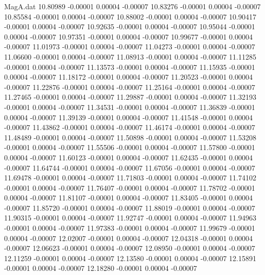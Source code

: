 \begin{filecontents}{MagA.dat}
  10.80989   -0.00001    0.00004   -0.00007
  10.83276   -0.00001    0.00004   -0.00007
  10.85584   -0.00001    0.00004   -0.00007
  10.88002   -0.00001    0.00004   -0.00007
  10.90417   -0.00001    0.00004   -0.00007
  10.92635   -0.00001    0.00004   -0.00007
  10.95044   -0.00001    0.00004   -0.00007
  10.97351   -0.00001    0.00004   -0.00007
  10.99677   -0.00001    0.00004   -0.00007
  11.01973   -0.00001    0.00004   -0.00007
  11.04273   -0.00001    0.00004   -0.00007
  11.06600   -0.00001    0.00004   -0.00007
  11.08913   -0.00001    0.00004   -0.00007
  11.11285   -0.00001    0.00004   -0.00007
  11.13573   -0.00001    0.00004   -0.00007
  11.15935   -0.00001    0.00004   -0.00007
  11.18172   -0.00001    0.00004   -0.00007
  11.20523   -0.00001    0.00004   -0.00007
  11.22876   -0.00001    0.00004   -0.00007
  11.25164   -0.00001    0.00004   -0.00007
  11.27465   -0.00001    0.00004   -0.00007
  11.29887   -0.00001    0.00004   -0.00007
  11.32193   -0.00001    0.00004   -0.00007
  11.34531   -0.00001    0.00004   -0.00007
  11.36839   -0.00001    0.00004   -0.00007
  11.39139   -0.00001    0.00004   -0.00007
  11.41548   -0.00001    0.00004   -0.00007
  11.43862   -0.00001    0.00004   -0.00007
  11.46174   -0.00001    0.00004   -0.00007
  11.48489   -0.00001    0.00004   -0.00007
  11.50898   -0.00001    0.00004   -0.00007
  11.53208   -0.00001    0.00004   -0.00007
  11.55506   -0.00001    0.00004   -0.00007
  11.57800   -0.00001    0.00004   -0.00007
  11.60123   -0.00001    0.00004   -0.00007
  11.62435   -0.00001    0.00004   -0.00007
  11.64744   -0.00001    0.00004   -0.00007
  11.67056   -0.00001    0.00004   -0.00007
  11.69478   -0.00001    0.00004   -0.00007
  11.71803   -0.00001    0.00004   -0.00007
  11.74102   -0.00001    0.00004   -0.00007
  11.76407   -0.00001    0.00004   -0.00007
  11.78702   -0.00001    0.00004   -0.00007
  11.81107   -0.00001    0.00004   -0.00007
  11.83405   -0.00001    0.00004   -0.00007
  11.85720   -0.00001    0.00004   -0.00007
  11.88019   -0.00001    0.00004   -0.00007
  11.90315   -0.00001    0.00004   -0.00007
  11.92747   -0.00001    0.00004   -0.00007
  11.94963   -0.00001    0.00004   -0.00007
  11.97383   -0.00001    0.00004   -0.00007
  11.99679   -0.00001    0.00004   -0.00007
  12.02007   -0.00001    0.00004   -0.00007
  12.04318   -0.00001    0.00004   -0.00007
  12.06623   -0.00001    0.00004   -0.00007
  12.08950   -0.00001    0.00004   -0.00007
  12.11259   -0.00001    0.00004   -0.00007
  12.13580   -0.00001    0.00004   -0.00007
  12.15891   -0.00001    0.00004   -0.00007
  12.18280   -0.00001    0.00004   -0.00007

\end{filecontents}
